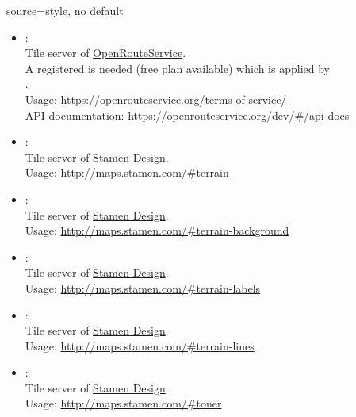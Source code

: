 \begin{docMrcKey}[supply]{source}{=}{style, no default}
\begin{itemize}
\clearpage
  \item{}:\\
    Tile server of \href{https://openrouteservice.org/}{OpenRouteService}.\\
    A registered  is needed (free plan available)
    which is applied by\\
    .\\
    Usage: \url{https://openrouteservice.org/terms-of-service/}\\
    API documentation: \url{https://openrouteservice.org/dev/#/api-docs}

  \item{}:\\
    Tile server of \href{http://stamen.com}{Stamen Design}.\\
    Usage: \url{http://maps.stamen.com/#terrain}

  \item{}:\\
    Tile server of \href{http://stamen.com}{Stamen Design}.\\
    Usage: \url{http://maps.stamen.com/#terrain-background}

\clearpage
  \item{}:\\
    Tile server of \href{http://stamen.com}{Stamen Design}.\\
    Usage: \url{http://maps.stamen.com/#terrain-labels}

  \item{}:\\
    Tile server of \href{http://stamen.com}{Stamen Design}.\\
    Usage: \url{http://maps.stamen.com/#terrain-lines}

  \item{}:\\
    Tile server of \href{http://stamen.com}{Stamen Design}.\\
    Usage: \url{http://maps.stamen.com/#toner}


\end{itemize}
\end{docMrcKey}
